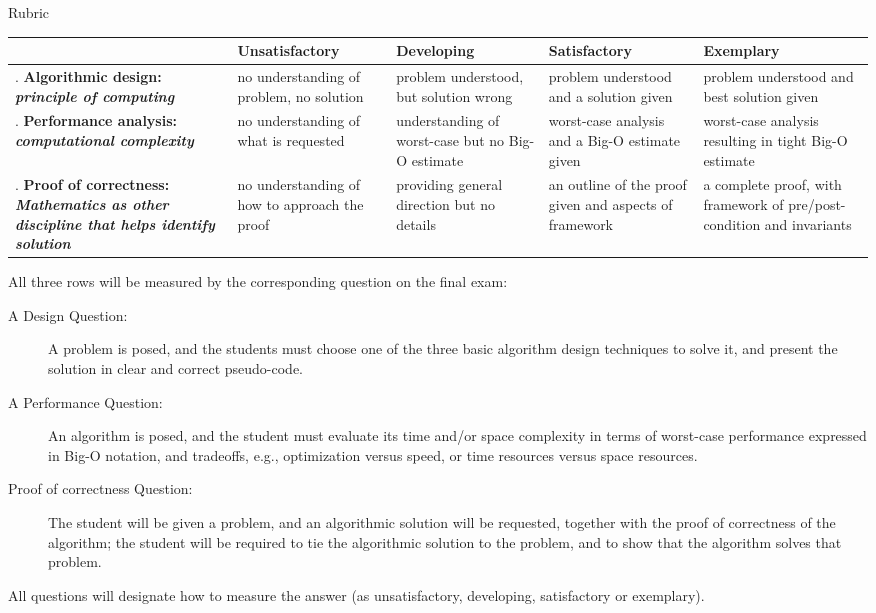 \begin{frame}
{Rubric}
\begin{center}
\tiny
\begin{tabular}{|>{\raggedright\arraybackslash}p{1.8cm}%
|>{\raggedright\arraybackslash}p{1.8cm}%
|>{\raggedright\arraybackslash}p{1.8cm}%
|>{\raggedright\arraybackslash}p{1.8cm}%
|>{\raggedright\arraybackslash}p{1.8cm}|}\hline
{\bf Performance Indicator} &
{\bf Unsatisfactory} & {\bf Developing} & {\bf Satisfactory}
& {\bf Exemplary} \\\hline\hline
1. {\bf Algorithmic design: {\em principle of computing}}
& no understanding of problem, no solution
& problem understood, but solution wrong
& problem understood and a solution given
& problem understood and best solution given \\\hline
2. {\bf Performance analysis: {\em computational complexity}}
& no understanding of what is requested
& understanding of worst-case but no Big-O estimate
& worst-case analysis and a Big-O estimate given
& worst-case analysis resulting in tight Big-O estimate \\\hline
3. {\bf Proof of correctness: {\em Mathematics as other discipline
that helps identify solution}}
& no understanding of how to approach the proof
& providing general direction but no details
& an outline of the proof given and aspects of framework
& a complete proof, with framework of pre/post-condition and
invariants\\\hline
\end{tabular}
\end{center}
\end{frame}

\begin{frame}
\footnotesize
All three rows
will be measured by the corresponding question on the final exam:
\begin{description}
\item[A Design Question:]  A problem is posed, and the students must
choose one of the three basic algorithm design techniques to solve it,
and present the solution in clear and correct pseudo-code.
\item[A Performance Question:]  An algorithm is posed, and the student
must evaluate its time and/or space complexity in terms of worst-case
performance expressed in Big-O notation, and tradeoffs, e.g.,
optimization versus speed, or time resources versus space resources.
\item[Proof of correctness Question:] The student will be given a
problem, and an algorithmic solution will be requested, together with
the proof of correctness of the algorithm; the student will be
required to tie the algorithmic solution to the problem, and to show that
the algorithm solves that problem.
\end{description}
All questions will designate how to measure the answer (as
unsatisfactory, developing, satisfactory or exemplary).
\end{frame}


